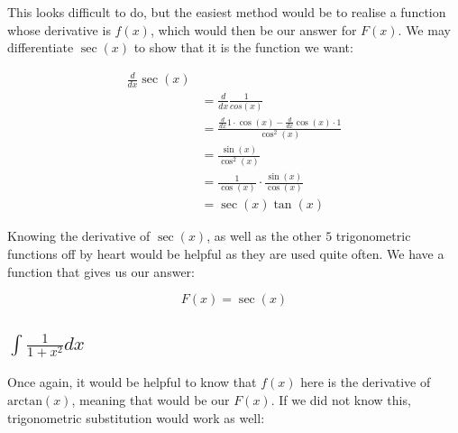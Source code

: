 \documentclass[12pt]{article}
\begin{document}
This looks difficult to do, but the easiest method would be to realise a function whose derivative is $f(x)$, which would then be our answer for $F(x)$.
We may differentiate $\sec(x)$ to show that it is the function we want:


\begin{align}
    \frac{d}{dx}\sec(x)                                                               \\
     & = \frac{d}{dx} \frac{1}{cos(x)}                                                \\
     & = \frac{\frac{d}{dx}1 \cdot \cos(x) - \frac{d}{dx}\cos(x) \cdot 1 }{\cos^2(x)} \\
     & = \frac{\sin(x)}{\cos^2(x)}                                                    \\
     & = \frac{1}{\cos(x)} \cdot \frac{\sin(x)}{\cos(x)}                              \\
     & = \sec(x)\tan(x)
\end{align}

Knowing the derivative of $\sec(x)$, as well as the other $5$ trigonometric functions off by heart would be helpful as they are used quite often.
We have a function that gives us our answer:

$$
    F(x) = \sec(x)
$$

\subsection{$\int \frac{1}{1+x^2} dx$}

Once again, it would be helpful to know that $f(x)$ here is the derivative of $\text{arctan}(x)$, meaning that would be our $F(x)$.
If we did not know this, trigonometric substitution would work as well:
\end{document}

